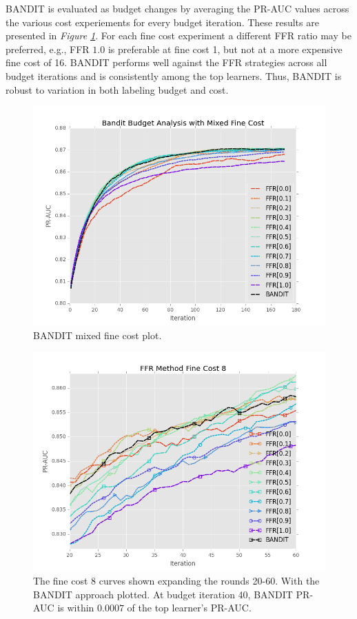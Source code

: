 \documentclass[ms]{nuthesis}
\begin{document}
BANDIT is evaluated as budget changes by averaging the PR-AUC values across the various
cost experiements for every budget iteration. These results are presented in
\textit{Figure \ref{fig:BanditMixedCostPR}}. For each fine cost experiment a different
FFR ratio may be preferred, e.g., FFR $1.0$ is preferable at fine cost 1, but not at a
more expensive fine cost of 16. BANDIT performs well against the FFR strategies across
all budget iterations and is consistently among the top learners. Thus, BANDIT is robust
to variation in both labeling budget and cost.

\FloatBarrier
\begin{figure}[!htb]
	\centering
    \includegraphics[width=1.0\columnwidth]{fig/BanditMixedCostPR}
    \caption{BANDIT mixed fine cost plot.}
    \label{fig:BanditMixedCostPR}
\end{figure}
\FloatBarrier


\FloatBarrier
\begin{figure}[!htb]
	\centering
    \includegraphics[width=1.0\columnwidth]{fig/BANDIT_PR_Cost8_rnds20_60}
    \caption{
    The fine cost 8 curves shown expanding the rounds 20-60. With the BANDIT approach
    plotted. At budget iteration 40, BANDIT PR-AUC is within $0.0007$ of the top learner's
    PR-AUC.
    }
    \label{fig:BANDIT_PR_Cost8_rnds20_60}
\end{figure}
\FloatBarrier
\end{document}
